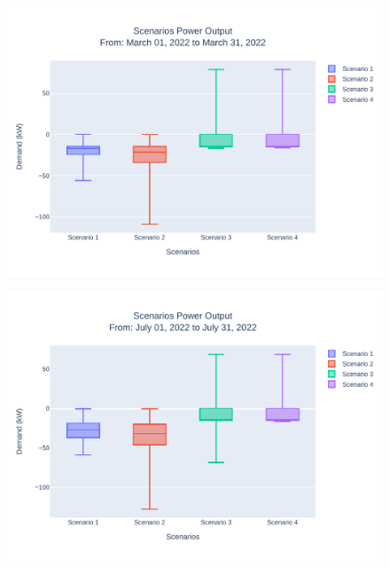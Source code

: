 \documentclass[conference]{IEEEtran}
\begin{document}
	\begin{figure}[H]
		\centering
		\includegraphics[width=1\linewidth]{Fig/0_Scn_Output_Run_2_Mar_01_2022_to_Mar_31_2022}
		\caption{}
		\label{fig:0scnoutputrun2mar012022tomar312022}
	\end{figure}

	\begin{figure}[H]
		\centering
		\includegraphics[width=1\linewidth]{Fig/4_Scn_Output_Run_2_Jul_01_2022_to_Jul_31_2022}
		\caption{}
		\label{fig:4scnoutputrun2jul012022tojul312022}
	\end{figure}
	
	
\end{document}
